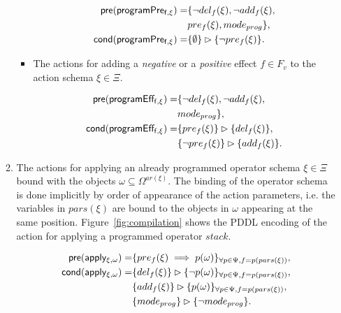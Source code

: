 \documentclass[letterpaper]{article} %
\newcommand{\pre}{\mathsf{pre}}     %
\newcommand{\cond}{\mathsf{cond}}   %
\begin{document}
\begin{itemize}
\begin{enumerate}
\begin{itemize}
\begin{small}
\begin{align*}
\hspace*{7pt}\pre(\mathsf{programPre_{f,\xi}})=&\{\neg del_{f}(\xi),\neg add_{f}(\xi),\\
& pre_{f}(\xi), mode_{prog}\},\\    
\cond(\mathsf{programPre_{f,\xi}})=&\{\emptyset\}\rhd\{\neg pre_{f}(\xi)\}.
\end{align*}
\end{small}

\item The actions for adding a {\em negative} or a {\em positive} effect $f\in F_v$ to the action schema $\xi\in\Xi$.

\begin{small}
\begin{align*}
\hspace*{7pt}\pre(\mathsf{programEff_{f,\xi}})=&\{\neg del_{f}(\xi),\neg add_{f}(\xi),\\                                                   
& mode_{prog}\},\\ 
\cond(\mathsf{programEff_{f,\xi}})=&\{pre_{f}(\xi)\}\rhd\{del_{f}(\xi)\},\\
&\{\neg pre_{f}(\xi)\}\rhd\{add_{f}(\xi)\}.
\end{align*}
\end{small}
\end{itemize}

\item The actions for applying an already programmed operator schema $\xi\in\Xi$ bound with the objects $\omega\subseteq\Omega^{ar(\xi)}$. The binding of the operator schema is done implicitly by order of appearance of the action parameters, i.e. the variables in $pars(\xi)$ are bound to the objects in $\omega$ appearing at the same position. Figure~\ref{fig:compilation} shows the PDDL encoding of the action for applying a programmed operator $stack$.
\begin{small}
\begin{align*}
\hspace*{7pt}\pre(\mathsf{apply_{\xi,\omega}})=&\{pre_{f}(\xi)\implies p(\omega)\}_{\forall p\in\Psi,f=p(pars(\xi))},\\
\cond(\mathsf{apply_{\xi,\omega}})=&\{del_{f}(\xi)\}\rhd\{\neg p(\omega)\}_{\forall p\in\Psi,f=p(pars(\xi))},\\
&\{add_{f}(\xi)\}\rhd\{p(\omega)\}_{\forall p\in\Psi,f=p(pars(\xi))},\\
&\{mode_{prog}\}\rhd\{\neg mode_{prog}\}.
\end{align*}
\end{small}


\end{enumerate}
\end{itemize}
\end{document}
